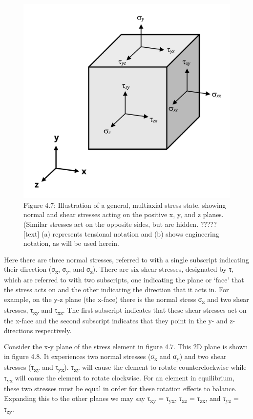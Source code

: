 \documentclass[
  letterpaper,
  DIV=11,
  numbers=noendperiod]{scrreprt}
\begin{document}
\begin{figure}[H]

{\centering \includegraphics[width=4.40625in,height=\textheight]{images/CH4 PNGs/4.7.png}

}

\caption{Figure 4.7: Illustration of a general, multiaxial stress state,
showing normal and shear stresses acting on the positive x, y, and z
planes. (Similar stresses act on the opposite sides, but are hidden.
?????{[}text{]} (a) represents tensional notation and (b) shows
engineering notation, as will be used herein.}

\end{figure}%

Here there are three normal stresses, referred to with a single
subscript indicating their direction (σ\textsubscript{x},
σ\textsubscript{y}, and σ\textsubscript{z}). There are six shear
stresses, designated by τ, which are referred to with two subscripts,
one indicating the plane or `face' that the stress acts on and the other
indicating the direction that it acts in. For example, on the y-z plane
(the x-face) there is the normal stress σ\textsubscript{x} and two shear
stresses, τ\textsubscript{xy} and τ\textsubscript{xz}. The first
subscript indicates that these shear stresses act on the x-face and the
second subscript indicates that they point in the y- and z-directions
respectively.

Consider the x-y plane of the stress element in figure 4.7. This 2D
plane is shown in figure 4.8. It experiences two normal stresses
(σ\textsubscript{x} and σ\textsubscript{y}) and two shear stresses
(τ\textsubscript{xy} and τ\textsubscript{yx}). τ\textsubscript{xy} will
cause the element to rotate counterclockwise while τ\textsubscript{yx}
will cause the element to rotate clockwise. For an element in
equilibrium, these two stresses must be equal in order for these
rotation effects to balance. Expanding this to the other planes we may
say τ\textsubscript{xy} = τ\textsubscript{yx}, τ\textsubscript{xz} =
τ\textsubscript{zx}, and τ\textsubscript{yz} = τ\textsubscript{zy}.
\end{document}
